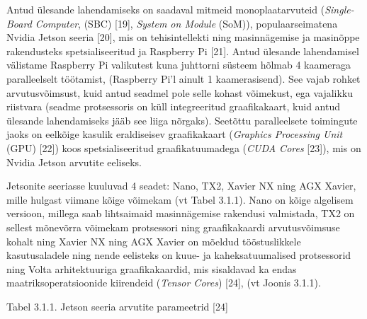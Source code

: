 \documentclass[12pt,a4paper]{report}
\begin{document}
Antud ülesande lahendamiseks on saadaval mitmeid monoplaatarvuteid (\emph{Single-Board Computer}, (SBC) {[}19{]}, \emph{System on Module} (SoM)), populaarseimatena Nvidia Jetson seeria {[}20{]}, mis on tehisintellekti ning masinnägemise ja masinõppe rakendusteks spetsialiseeritud ja Raspberry Pi {[}21{]}. Antud ülesande lahendamisel välistame Raspberry Pi valikutest kuna juhttorni süsteem hõlmab 4 kaameraga paralleelselt töötamist, (Raspberry Pi'l ainult 1 kaamerasisend). See vajab rohket arvutusvõimsust, kuid antud seadmel pole selle kohast võimekust, ega vajalikku riistvara (seadme protsessoris on küll integreeritud graafikakaart, kuid antud ülesande lahendamiseks jääb see liiga nõrgaks). Seetõttu paralleelsete toimingute jaoks on eelkõige kasulik eraldiseisev graafikakaart (\emph{Graphics Processing Unit} (GPU) {[}22{]}) koos spetsialiseeritud graafikatuumadega (\emph{CUDA Cores} {[}23{]}), mis on Nvidia Jetson arvutite eeliseks.

Jetsonite seeriasse kuuluvad 4 seadet: Nano, TX2, Xavier NX ning AGX Xavier, mille hulgast viimane kõige võimekam (vt Tabel 3.1.1). Nano on kõige algelisem versioon, millega saab lihtsaimaid masinnägemise rakendusi valmistada, TX2 on sellest mõnevõrra võimekam protsessori ning graafikakaardi arvutusvõimsuse kohalt ning Xavier NX ning AGX Xavier on mõeldud tööstuslikkele kasutusaladele ning nende eelisteks on kuue- ja kaheksatuumalised protsessorid ning Volta arhitektuuriga graafikakaardid, mis sisaldavad ka endas maatriksoperatsioonide kiirendeid (\emph{Tensor Cores}) {[}24{]}, (vt Joonis 3.1.1).

Tabel 3.1.1. Jetson seeria arvutite parameetrid {[}24{]}
\end{document}
